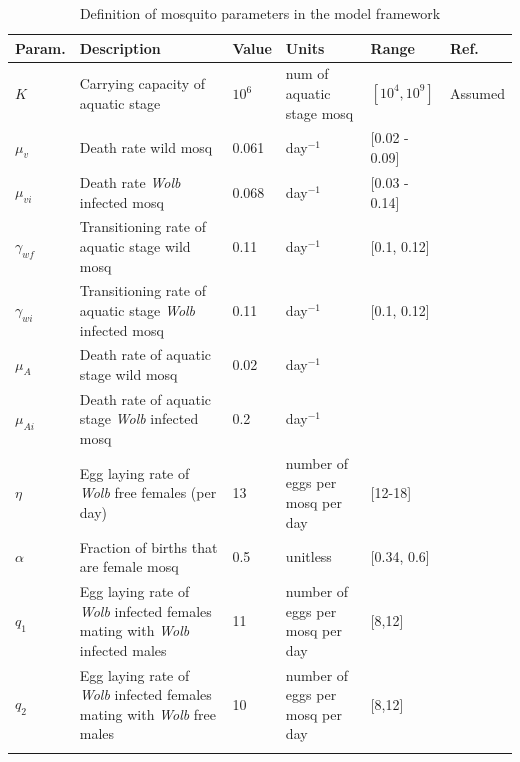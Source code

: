 \documentclass{ws-rv9x6}
\begin{document}
  \begin{longtable}{C{1.25cm} L{3cm} C{1.7cm} C{1.2cm} C{2.2cm} C{0.8cm}}
   \toprule
        Param. & Description & Value & Units & Range & Ref.\\
    \midrule
$K$ & \footnotesize Carrying capacity of aquatic stage & $10^6$ & \footnotesize num of aquatic stage mosq& $[10^4,10^9]$ & \footnotesize Assumed\\
\midrule
$\mu_{v}$ & \footnotesize Death rate wild mosq & 0.061 & \footnotesize day$^{-1}$ & [0.02 - 0.09] & \cite{mcmeniman2009stable}  \\
\midrule
$\mu_{vi}$ & \footnotesize Death rate \textit{Wolb} infected mosq & 0.068 & \footnotesize day$^{-1}$& [0.03 - 0.14]& \cite{styer2007mortality, walker2011w}\\
\midrule
$\gamma_{wf}$ & \footnotesize Transitioning rate of aquatic stage wild mosq & 0.11 & \footnotesize day$^{-1}$ & [0.1, 0.12] & \cite{hoffmann2014stability}\\
\midrule
$\gamma_{wi}$ & \footnotesize Transitioning rate of aquatic stage \textit{Wolb} infected mosq & 0.11 & \footnotesize day$^{-1}$ & [0.1, 0.12] & \cite{hoffmann2014stability}\\
\midrule
$\mu_A$ & \footnotesize Death rate of aquatic stage wild mosq & 0.02 & \footnotesize day$^{-1}$& & \cite{xue2017two}\\
\midrule
$\mu_{Ai}$ & \footnotesize Death rate of aquatic stage \textit{Wolb} infected mosq & 0.2 & \footnotesize day$^{-1}$& & \cite{xue2017two} \\
\midrule
$\eta$ & \footnotesize Egg laying rate of \textit{Wolb} free females (per day) & 13 & \footnotesize number of eggs per mosq per day & [12-18]& \cite{hoffmann2014stability, mcmeniman2009stable}\\
\midrule
$\alpha$ & \footnotesize Fraction of births that are female mosq & 0.5 & \footnotesize unitless & [0.34, 0.6] & \cite{arrivillaga2004food} \\
\midrule
$q_1$ & \footnotesize Egg laying rate of \textit{Wolb} infected females mating with \textit{Wolb} infected males & 11 & \footnotesize number of eggs per mosq per day& [8,12] & \cite{hoffmann2014stability, mcmeniman2009stable}\\
\midrule
$q_2$ & \footnotesize Egg laying rate of \textit{Wolb} infected females mating with \textit{Wolb} free males & 10 & \footnotesize number of eggs per mosq per day & [8,12] & \cite{hoffmann2014stability, mcmeniman2009stable}\\
\bottomrule
\caption{Definition of mosquito parameters in the model framework}
\label{tab: param_mosq_table}
\end{longtable}
\endgroup
\end{document}
